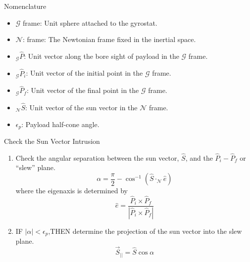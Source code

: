 \documentclass{beamer}
\begin{document}
\begin{frame}
\begin{block}{Nomenclature}
\begin{itemize}
\item $\mathcal{G}$ frame: Unit sphere attached to the gyrostat.
\item $\mathcal{N}$: frame: The Newtonian frame fixed in the inertial space.
\item $_\mathcal{G}\hat{P}$: Unit vector along the bore sight of payload in the $\mathcal{G}$ frame.
\item $_\mathcal{G}\hat{P}_i$: Unit vector of the initial point in the $\mathcal{G}$ frame.
\item $_\mathcal{G}\hat{P}_f$: Unit vector of the final point in the $\mathcal{G}$ frame.
\item $_\mathcal{N}\hat{S}$: Unit vector of the sun vector in the $\mathcal{N}$ frame.
 \item $\epsilon_p$: Payload half-cone angle.
\end{itemize}
\end{block}
\end{frame}

\begin{frame}
\begin{block}{Check the Sun Vector Intrusion}
\begin{enumerate}
\item Check the angular separation between the sun vector, $\hat{S}$, and the $\hat{P}_i-\hat{P}_f$ or ``slew'' plane.
\begin{equation}
\alpha=\frac{\pi}{2}-\cos^{-1}(\hat{S}\cdot_\mathcal{N}\hat{e})
\end{equation}
where the eigenaxis is determined by
\begin{equation}\label{eaxis}
\hat{e}=\frac{\hat{P}_i\times\hat{P}_f}{|\hat{P}_i\times \hat{P}_f|}
\end{equation} 

\item IF $|\alpha|<\epsilon_p$,THEN determine the projection of the sun vector into the slew plane.
\begin{equation}\label{Sbar}
\vec{S}_{||}=\hat{S}\cos\alpha
\end{equation}

\end{enumerate}
\end{block}
\end{frame}
\end{document}
